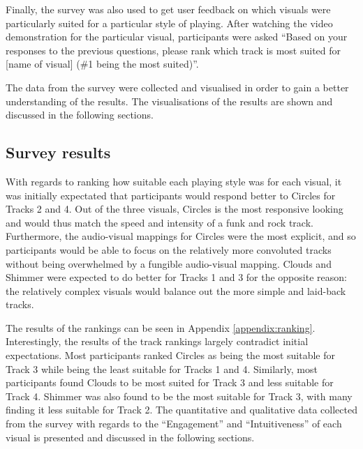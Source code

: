 \documentclass[../initial_thesis.tex]{subfiles}
\begin{document}
Finally, the survey was also used to get user feedback on which visuals were particularly suited for a particular style of playing. After watching the video demonstration for the particular visual, participants were asked ``Based on your responses to the previous questions, please rank which track is most suited for [name of visual] (\#1 being the most suited)''.

The data from the survey were collected and visualised in order to gain a better understanding of the results. The visualisations of the results are shown and discussed in the following sections.

\subsection{Survey results}
With regards to ranking how suitable each playing style was for each visual, it was initially expectated that participants would respond better to Circles for Tracks 2 and 4. Out of the three visuals, Circles is the most responsive looking and would thus match the speed and intensity of a funk and rock track. Furthermore, the audio-visual mappings for Circles were the most explicit, and so participants would be able to focus on the relatively more convoluted tracks without being overwhelmed by a fungible audio-visual mapping. Clouds and Shimmer were expected to do better for Tracks 1 and 3 for the opposite reason: the relatively complex visuals would balance out the more simple and laid-back tracks.\par

The results of the rankings can be seen in Appendix \ref{appendix:ranking}. Interestingly, the results of the track rankings largely contradict initial expectations. Most participants ranked Circles as being the most suitable for Track 3 while being the least suitable for Tracks 1 and 4. Similarly, most participants found Clouds to be most suited for Track 3 and less suitable for Track 4. Shimmer was also found to be the most suitable for Track 3, with many finding it less suitable for Track 2. The quantitative and qualitative data collected from the survey with regards to the ``Engagement'' and ``Intuitiveness'' of each visual is presented and discussed in the following sections.
\end{document}
